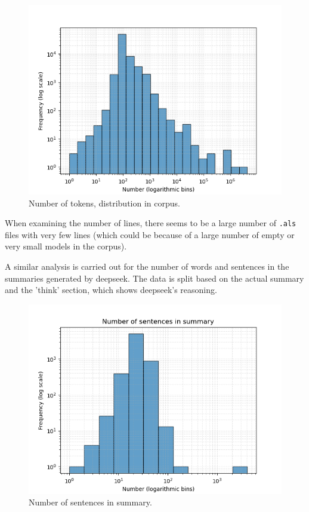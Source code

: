 \documentclass[conference]{IEEEtran}
\begin{document}
    \begin{figure}[htbp]
        \centerline{\includegraphics[width=\linewidth]{"./Number of tokens, distribution in corpus.png"}}
        \caption{Number of tokens, distribution in corpus.}
        \label{fig}
        \end{figure}

When examining the number of lines, there seems to be a large number of \verb|.als| files with very few lines (which could be because of a large number of empty or very small models in the corpus).

A similar analysis is carried out for the number of words and sentences in the summaries generated by deepseek. The data is split based on the actual summary and the 'think' section, which shows deepseek's reasoning.

\begin{figure}[htbp]
    \centerline{\includegraphics[width=\linewidth]{"./Number of sentences in summary.png"}}
    \caption{Number of sentences in summary.}
    \label{fig}
    \end{figure}
\end{document}
